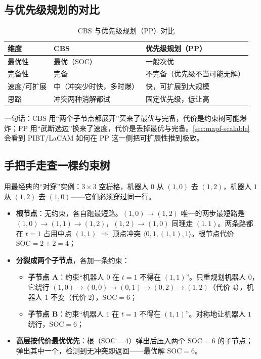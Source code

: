 \subsection{与优先级规划的对比}
\label{sec:mapf-cbs-vs-pp}

\begin{table}[H]\centering\small
\caption{CBS 与优先级规划（PP）对比}
\label{tab:mapf-cbs-pp}
\begin{tabular}{lll}
\toprule
维度 & CBS & 优先级规划（PP） \\
\midrule
最优性 & 最优（SOC） & 一般次优 \\
完备性 & 完备 & 不完备（优先级不当可能无解） \\
速度/可扩展 & 中（冲突少时快，多时爆） & 快，可扩展到大规模 \\
思路 & 冲突两种消解都试 & 固定优先级，低让高 \\
\bottomrule
\end{tabular}
\end{table}

一句话：CBS 用“两个子节点都展开”买来了最优与完备，代价是约束树可能爆炸；PP 用“武断选边”换来了速度，代价是丢掉最优与完备。\cref{sec:mapf-scalable} 会看到 PIBT/LaCAM 如何在 PP 这一侧把可扩展性推到极致。

\subsection{手把手走查一棵约束树}
\label{sec:mapf-cbs-trace}

用最经典的“对穿”实例：$3\times3$ 空栅格，机器人 $0$ 从 $(1,0)$ 去 $(1,2)$，机器人 $1$ 从 $(1,2)$ 去 $(1,0)$——它们必须穿过同一行。

\begin{itemize}
  \item \textbf{根节点}：无约束，各自跑最短路。$(1,0)\to(1,2)$ 唯一的两步最短路是 $(1,0)\to(1,1)\to(1,2)$，$(1,2)\to(1,0)$ 同理走 $(1,1)$。两条路都在 $t{=}1$ 占用中点 $(1,1)$ $\Rightarrow$ 顶点冲突 $\langle 0,1,(1,1),1\rangle$。根节点代价 $\mathrm{SOC}=2+2=4$；
  \item \textbf{分裂成两个子节点}，各加一条约束：
    \begin{itemize}
      \item \textbf{子节点 A}：约束“机器人 $0$ 在 $t{=}1$ 不得在 $(1,1)$”。只重规划机器人 $0$，它绕行 $(1,0)\to(0,0)\to(0,1)\to(0,2)\to(1,2)$（代价 $4$），机器人 $1$ 不变（代价 $2$），$\mathrm{SOC}=6$；
      \item \textbf{子节点 B}：约束“机器人 $1$ 在 $t{=}1$ 不得在 $(1,1)$”。对称地让机器人 $1$ 绕行，$\mathrm{SOC}=6$；
    \end{itemize}
  \item \textbf{高层按代价最优优先}：根（$\mathrm{SOC}=4$）弹出后压入两个 $\mathrm{SOC}=6$ 的子节点；弹出其中一个，检测到无冲突即返回——最优解 $\mathrm{SOC}=6$。
\end{itemize}

